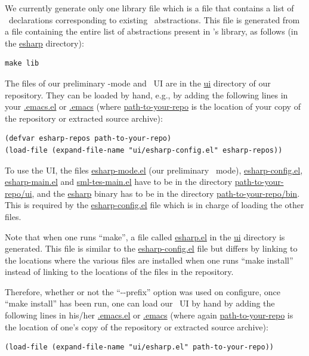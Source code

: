 \documentclass[final]{article}
\begin{document}
%
We currently generate only one library file which is a file that
contains a list of \eml\ declarations corresponding to existing
\nuprl\ abstractions.  This file is generated from a file containing
the entire list of abstractions present in \nuprl's library, as
follows (in the \url{esharp} directory):
\begin{center}
\begin{verbatim}
make lib
\end{verbatim}
\end{center}


%
The files of our preliminary \eml-mode and \emacs~UI are in the
\url{ui} directory of our repository.  They can be loaded by hand,
e.g., by adding the following lines in your \url{.emacs.el} or
\url{.emacs} (where \url{path-to-your-repo} is the location of your
copy of the repository or extracted source archive):
\begin{center}
\begin{verbatim}
(defvar esharp-repos path-to-your-repo)
(load-file (expand-file-name "ui/esharp-config.el" esharp-repos))
\end{verbatim}
\end{center}

To use the UI, the files \url{esharp-mode.el} (our preliminary
\eml\ mode), \url{esharp-config.el}, \url{esharp-main.el} and
\url{sml-tes-main.el} have to be in the directory
\url{path-to-your-repo/ui}, and the \url{esharp} binary has to be in
the directory \url{path-to-your-repo/bin}.  This is required by the
\url{esharp-config.el} file which is in charge of loading the other
files.

Note that when one runs ``make'', a file called \url{esharp.el} in the
\url{ui} directory is generated.  This file is similar to the
\url{esharp-config.el} file but differs by linking to the locations
where the various files are installed when one runs ``make install''
instead of linking to the locations of the files in the repository.

Therefore, whether or not the ``$\mbox{-}$$\mbox{-}$prefix'' option
was used on configure, once ``make install'' has been run, one can
load our \emacs~UI by hand by adding the following lines in his/her
\url{.emacs.el} or \url{.emacs} (where again \url{path-to-your-repo}
is the location of one's copy of the repository or extracted source
archive):
\begin{center}
\begin{verbatim}
(load-file (expand-file-name "ui/esharp.el" path-to-your-repo))
\end{verbatim}
\end{center}
\end{document}
